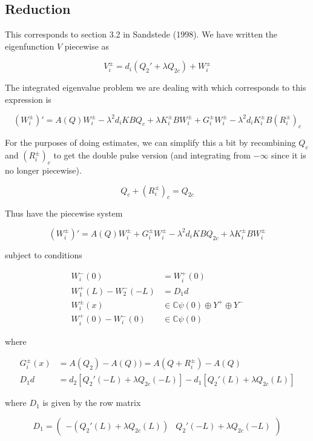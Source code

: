 \documentclass[12pt]{article}
\def\C{{\mathbb C}}
\begin{document}
\subsection*{Reduction}
This corresponds to section 3.2 in Sandstede (1998). We have written the eigenfunction $V$ piecewise as

\begin{equation}\label{dpeigform}
V_i^\pm = d_i( Q_2' + \lambda Q_{2c} ) + W_i^\pm
\end{equation}

The integrated eigenvalue problem we are dealing with which corresponds to this expression is

\begin{equation}\label{inteigQ}
(W_i^\pm)' = A(Q)W_i^\pm - \lambda^2 d_i KBQ_{c} + \lambda K_i^\pm BW_i^\pm + G_i^\pm W_i^\pm - \lambda^2 d_i K_i^\pm B (R_i^\pm)_c
\end{equation}

For the purposes of doing estimates, we can simplify this a bit by recombining $Q_c$ and $(R_i^\pm)_c$ to get the double pulse version (and integrating from $-\infty$ since it is no longer piecewise).

\[
Q_c + (R_i^\pm)_c = Q_{2c}
\]

Thus have the piecewise system

\begin{equation}\label{inteigQ2}
(W_i^\pm)' = A(Q)W_i^\pm + G_i^\pm W_i^\pm - \lambda^2 d_i K B Q_{2c} + \lambda K_i^\pm BW_i^\pm 
\end{equation}

subject to conditions

\begin{align*}
W_i^-(0) &= W_i^+(0) \\
W_1^+(L) - W_2^-(-L) &= D_1 d \\
W_i^\pm(x) &\in \C \psi(0) \oplus Y^+ \oplus Y^- \\
W_i^+(0) - W_i^-(0) &\in \C \psi(0) 
\end{align*}

where

\begin{align*}
G_i^\pm(x) &= A(Q_2) - A(Q)) = A(Q + R_i^\pm) - A(Q) \\
D_1 d &= d_2 [ Q_2'(-L) + \lambda Q_{2c}(-L)] - d_1 [ Q_2'(L) + \lambda Q_{2c}(L)]
\end{align*}

where $D_1$ is given by the row matrix 

\[
D_1 = \begin{pmatrix} -(Q_2'(L) + \lambda Q_{2c}(L)) & Q_2'(-L) + \lambda Q_{2c}(-L) \end{pmatrix}
\]
\end{document}
